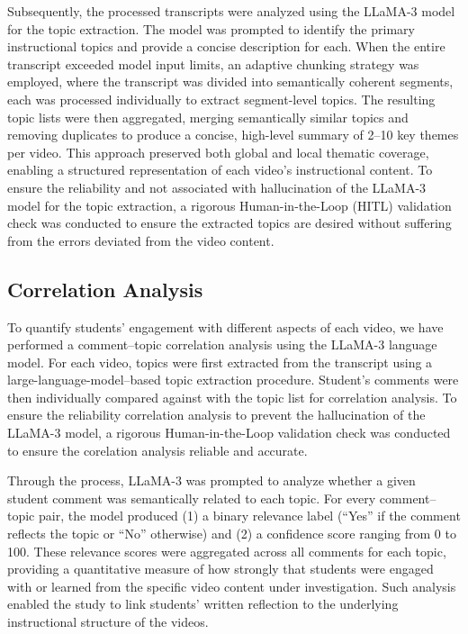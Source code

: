 \documentclass[fleqn,10pt]{JLA_article} %
\begin{document}
Subsequently, the processed transcripts were analyzed using the LLaMA-3 model for the topic extraction. The model was prompted to identify the primary instructional topics and provide a concise description for each. When the entire transcript exceeded model input limits, an adaptive chunking strategy was employed, where the transcript was divided into semantically coherent segments, each was processed individually to extract segment-level topics. The resulting topic lists were then aggregated, merging semantically similar topics and removing duplicates to produce a concise, high-level summary of 2--10 key themes per video. This approach preserved both global and local thematic coverage, enabling a structured representation of each video's instructional content. To ensure the reliability and not associated with hallucination of the LLaMA-3 model for the topic extraction, a rigorous Human-in-the-Loop (HITL) validation check was conducted to ensure the extracted topics are desired without suffering from the errors deviated from the video content.

\subsection{Correlation Analysis}

To quantify students' engagement with different aspects of each video, we have performed a comment--topic correlation analysis using the LLaMA-3 language model. For each video, topics were first extracted from the transcript using a large-language-model--based topic extraction procedure. Student's comments were then individually compared against with the topic list for correlation analysis. To ensure the reliability correlation analysis to prevent the hallucination of the LLaMA-3 model, a rigorous Human-in-the-Loop validation check was conducted to ensure the corelation analysis reliable and accurate.

Through the process, LLaMA-3 was prompted to analyze whether a given student comment was semantically related to each topic. For every comment--topic pair, the model produced (1) a binary relevance label (``Yes'' if the comment reflects the topic or ``No'' otherwise) and (2) a confidence score ranging from 0 to 100. These relevance scores were aggregated across all comments for each topic, providing a quantitative measure of how strongly that students were engaged with or learned from the specific video content under investigation. Such analysis enabled the study to link students' written reflection to the underlying instructional structure of the videos.
\end{document}
